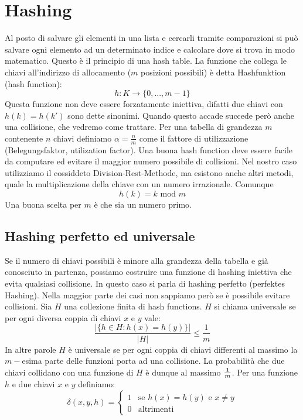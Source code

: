 \documentclass[a4paper]{book}
\begin{document}
\chapter{Hashing}
Al posto di salvare gli elementi in una lista e cercarli tramite comparazioni si può salvare ogni elemento ad un determinato indice e calcolare dove si trova in modo matematico. Questo è il principio di una hash table. La funzione che collega le chiavi all'indirizzo di allocamento ($m$ posizioni possibili) è detta Hashfunktion (hash function):
$$h: K \rightarrow \{0,..., m-1\}$$
Questa funzione non deve essere forzatamente iniettiva, difatti due chiavi con $h(k)=h(k')$ sono dette sinonimi. Quando questo accade succede però anche una collisione, che vedremo come trattare. Per una tabella di grandezza $m$ contenente $n$ chiavi definiamo $\alpha = \frac{n}{m} $ come il fattore di utilizzazione (Belegungsfaktor, utilization factor). Una buona hash function deve essere facile da computare ed evitare il maggior numero possibile di collisioni.
Nel nostro caso utilizziamo il cossiddeto Division-Rest-Methode, ma esistono anche altri metodi, quale la multiplicazione della chiave con un numero irrazionale. Comunque
$$ h(k)=k \mbox{ mod }m$$
Una buona scelta per $m$ è che sia un numero primo.
\section{Hashing perfetto ed universale}
Se il numero di chiavi possibili è minore alla grandezza della tabella e già conosciuto in partenza, possiamo costruire una funzione di hashing iniettiva che evita qualsiasi collisione. In questo caso si parla di hashing perfetto (perfektes Hashing).
Nella maggior parte dei casi non sappiamo però se è possibile evitare collisioni. Sia $H$ una collezione finita di hash functions. $H$ si chiama universale se per ogni diversa coppia di chiavi $x$ e $y$ vale:
$$ \frac{\left|\{h\in H: h(x)=h(y)\}\right|}{|H|} \leq \frac{1}{m}$$
In altre parole $H$ è universale se per ogni coppia di chiavi differenti al massimo la $m-$esima parte delle funzioni porta ad una collisione. La probabilità che due chiavi collidano con una funzione di $H$ è dunque al massimo $1\over m$. Per una funzione $h$ e due chiavi $x$ e $y$ definiamo:
\[
\delta (x,y,h) = \begin{cases} 1 & \mbox{se }h(x)=h(y)\mbox{ e } x\neq y  \\
0 & \mbox{altrimenti}\end{cases}
\]
\end{document}
